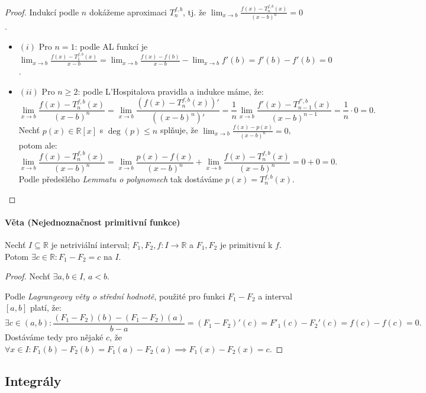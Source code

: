 \documentclass[10pt,a4paper]{article}
\newcommand{\R}{{\mathbb{R}}}
\begin{document}
\begin{proof}
    Indukcí podle $n$ dokážeme aproximaci $T_n^{f,b}$, tj. že $\displaystyle \lim_{x\to b}\frac{f(x) - T_n^{f,b}(x)}{(x-b)^n} = 0$.
    
    \begin{itemize}
        \item $(i)$ Pro $n=1$: podle AL funkcí je $\displaystyle \lim_{x\to b}\frac{f(x) - T_1^{f,b}(x)}{x-b} = \lim_{x\to b}\frac{f(x) - f(b)}{x-b} - \lim_{x\to b}f'(b) = f'(b) - f'(b) = 0$.
        \item $(ii)$ Pro $n\geq 2$: podle L'Hospitalova pravidla a indukce máme, že:
            \[
                \lim_{x\to b}\frac{f(x) - T_n^{f,b}(x)}{(x-b)^n} = \lim_{x\to b} \frac{\left(f(x) - T_n^{f,b}(x)\right)'}{\left((x-b)^n\right)'} = 
                \frac 1n \lim_{x\to b}\frac{f'(x) - T_{n-1}^{f',b}(x)}{(x-b)^{n-1}}= \frac 1n \cdot 0 = 0.
            \] Nechť $p(x) \in \R[x]$ s $\deg (p)\leq n$ splňuje, že $\displaystyle \lim_{x\to b}\frac{f(x) - p(x)}{(x-b)^n}=0$,
             potom ale:
            \[
                \displaystyle \lim_{x\to b}\frac{f(x) - T_n^{f,b}(x)}{(x-b)^n} = \lim_{x\to b}\frac{p(x) - f(x)}{(x-b)^n} + \lim_{x\to b}\frac{f(x) - T_n^{f,b}(x)}{(x-b)^n} = 0 + 0 = 0.
            \]Podle předešlého \textit{Lemmatu o polynomech} tak dostáváme $p(x) = T_n^{f,b}(x)$.
    \end{itemize}

\end{proof}

\paragraph*{Věta (Nejednoznačnost primitivní funkce)} Nechť $I \subseteq \R$ je netriviální interval; 
$F_1 , F_2, f:I \to \R$ a $F_1,F_2$ je primitivní k $f$. Potom $\exists c \in \R : F_1 - F_2 = c$ na $I$.

\begin{proof}
    Nechť $\exists a,b \in I$, $a < b$. 
    
    Podle \textit{Lagrangeovy věty o střední hodnotě}, použité pro funkci $F_1 - F_2$ a interval $[a, b]$ platí, že:
    \[
        \exists c \in (a, b): \frac{(F_1 - F_2)(b) - (F_1 - F_2)(a)}{b-a} = (F_1-F_2)'(c) = F'_1(c) - F_2'(c) = f(c)-f(c)=0.
    \]
    Dostáváme tedy pro nějaké $c$, že $\forall x \in I: F_1(b) - F_2(b) = F_1(a) - F_2(a) \implies F_1(x) - F_2(x) = c$.

\end{proof}
\subsection{Integrály}
\end{document}

